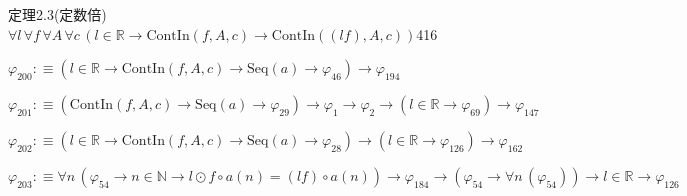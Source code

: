 \begin{fullproof}{定理2.3(定数倍)}{$\forall l\,\forall f\,\forall A\,\forall c\,(l \in \mathbb{R} \to \mathrm{ContIn}(f,A,c) \to \mathrm{ContIn}((l f),A,c))$}{416}
\begin{abbrevlist}
\item $\varphi_{200} :\equiv (l \in \mathbb{R} \to \mathrm{ContIn}(f,A,c) \to \mathrm{Seq}(a) \to \varphi_{46}) \to \varphi_{194}$
\item $\varphi_{201} :\equiv (\mathrm{ContIn}(f,A,c) \to \mathrm{Seq}(a) \to \varphi_{29}) \to \varphi_{1} \to \varphi_{2} \to (l \in \mathbb{R} \to \varphi_{69}) \to \varphi_{147}$
\item $\varphi_{202} :\equiv (l \in \mathbb{R} \to \mathrm{ContIn}(f,A,c) \to \mathrm{Seq}(a) \to \varphi_{28}) \to (l \in \mathbb{R} \to \varphi_{126}) \to \varphi_{162}$
\item $\varphi_{203} :\equiv \forall n\,(\varphi_{54} \to n \in \mathbb{N} \to l \odot f \circ a(n) = (l f) \circ a(n)) \to \varphi_{184} \to (\varphi_{54} \to \forall n\,(\varphi_{54})) \to l \in \mathbb{R} \to \varphi_{126}$
\end{abbrevlist}
\end{fullproof}
